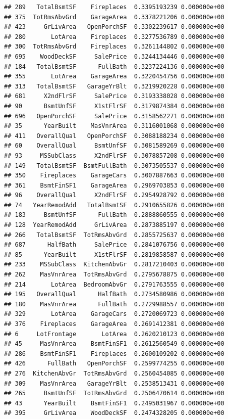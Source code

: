 \documentclass[american,]{article}
\theoremstyle{definition}
\theoremstyle{definition}
\theoremstyle{definition}
\theoremstyle{remark}
\begin{document}
\begin{verbatim}
## 289   TotalBsmtSF    Fireplaces  0.3395193239 0.000000e+00
## 375  TotRmsAbvGrd    GarageArea  0.3378221206 0.000000e+00
## 423     GrLivArea   OpenPorchSF  0.3302239617 0.000000e+00
## 280       LotArea    Fireplaces  0.3277536789 0.000000e+00
## 300  TotRmsAbvGrd    Fireplaces  0.3261144802 0.000000e+00
## 695    WoodDeckSF     SalePrice  0.3244134446 0.000000e+00
## 184   TotalBsmtSF      FullBath  0.3237224136 0.000000e+00
## 355       LotArea    GarageArea  0.3220454756 0.000000e+00
## 313   TotalBsmtSF   GarageYrBlt  0.3219920228 0.000000e+00
## 681     X2ndFlrSF     SalePrice  0.3193338028 0.000000e+00
## 90      BsmtUnfSF     X1stFlrSF  0.3179874384 0.000000e+00
## 696   OpenPorchSF     SalePrice  0.3158562271 0.000000e+00
## 35      YearBuilt    MasVnrArea  0.3116001068 0.000000e+00
## 411   OverallQual   OpenPorchSF  0.3088188234 0.000000e+00
## 60    OverallQual     BsmtUnfSF  0.3081589269 0.000000e+00
## 93     MSSubClass     X2ndFlrSF  0.3078857208 0.000000e+00
## 149   TotalBsmtSF  BsmtFullBath  0.3073505537 0.000000e+00
## 350    Fireplaces    GarageCars  0.3007887663 0.000000e+00
## 361    BsmtFinSF1    GarageArea  0.2969703853 0.000000e+00
## 96    OverallQual     X2ndFlrSF  0.2954928792 0.000000e+00
## 74   YearRemodAdd   TotalBsmtSF  0.2910655826 0.000000e+00
## 183     BsmtUnfSF      FullBath  0.2888860555 0.000000e+00
## 128  YearRemodAdd     GrLivArea  0.2873885197 0.000000e+00
## 266   TotalBsmtSF  TotRmsAbvGrd  0.2855725637 0.000000e+00
## 687      HalfBath     SalePrice  0.2841076756 0.000000e+00
## 85      YearBuilt     X1stFlrSF  0.2819858587 0.000000e+00
## 233    MSSubClass  KitchenAbvGr  0.2817210403 0.000000e+00
## 262    MasVnrArea  TotRmsAbvGrd  0.2795678875 0.000000e+00
## 214       LotArea  BedroomAbvGr  0.2791763555 0.000000e+00
## 195   OverallQual      HalfBath  0.2734580986 0.000000e+00
## 180    MasVnrArea      FullBath  0.2729988557 0.000000e+00
## 329       LotArea    GarageCars  0.2720069723 0.000000e+00
## 376    Fireplaces    GarageArea  0.2691412381 0.000000e+00
## 6     LotFrontage       LotArea  0.2620210123 0.000000e+00
## 45     MasVnrArea    BsmtFinSF1  0.2612560549 0.000000e+00
## 286    BsmtFinSF1    Fireplaces  0.2600109202 0.000000e+00
## 426      FullBath   OpenPorchSF  0.2599774255 0.000000e+00
## 276  KitchenAbvGr  TotRmsAbvGrd  0.2560454085 0.000000e+00
## 309    MasVnrArea   GarageYrBlt  0.2538513431 0.000000e+00
## 265     BsmtUnfSF  TotRmsAbvGrd  0.2506470614 0.000000e+00
## 43      YearBuilt    BsmtFinSF1  0.2495031967 0.000000e+00
## 395     GrLivArea    WoodDeckSF  0.2474328205 0.000000e+00

\end{verbatim}
\end{document}
